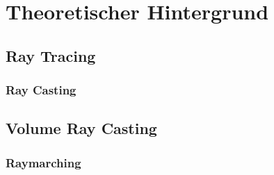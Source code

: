 
\chapter{Theoretischer Hintergrund}
\label{chap:theoretical_background}

\section{Ray Tracing}
\label{sec:ray_tracing}

\subsection{Ray Casting}
\label{subsec:ray_casting}

\section{Volume Ray Casting}
\label{sec:volume_ray_casting}

\subsection{Raymarching}
\label{subsec:raymarching}
